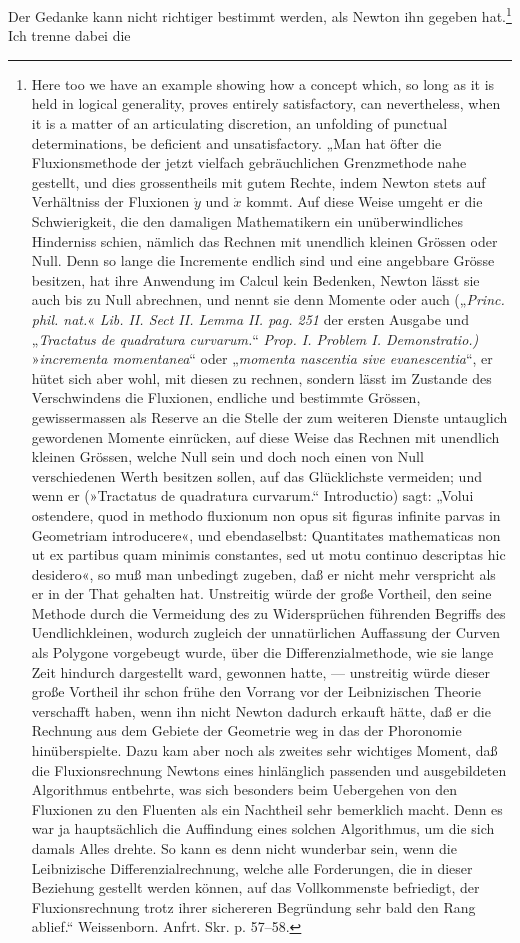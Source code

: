 \documentclass[12pt,a4paper,openany]{book}
\begin{document}
Der Gedanke kann nicht richtiger bestimmt werden,
als Newton ihn gegeben hat.\footnote[2]{Here too we have an example showing how a concept which, so long as it is held in logical generality, proves entirely satisfactory, can nevertheless, when it is a matter of an articulating discretion, an unfolding of punctual determinations, be deficient and unsatisfactory. „Man hat öfter die Fluxionsmethode der jetzt vielfach gebräuchlichen Grenzmethode nahe gestellt, und dies grossentheils mit gutem Rechte, indem Newton stets auf Verhältniss der Fluxionen $\dot{y}$ und $\dot{x}$ kommt. Auf diese Weise umgeht er die Schwierigkeit, die den damaligen Mathematikern ein unüberwindliches Hinderniss schien, nämlich das Rechnen mit unendlich kleinen Grössen oder Null. Denn so lange die Incremente endlich sind und eine angebbare Grösse besitzen, hat ihre Anwendung im Calcul kein Bedenken, Newton lässt sie auch bis zu Null abrechnen, und nennt sie denn Momente oder auch („\textit{Princ. phil. nat.}« \textit{Lib. II. Sect II. Lemma II. pag. 251} der ersten Ausgabe und „\textit{Tractatus de quadratura curvarum.}“ \textit{Prop. I. Problem I. Demonstratio.)} »\textit{incrementa momentanea}“ oder „\textit{momenta nascentia sive evanescentia}“, er hütet sich aber wohl, mit diesen zu rechnen, sondern lässt im Zustande des Verschwindens die Fluxionen, endliche und bestimmte Grössen, gewissermassen als Reserve an die Stelle der zum weiteren Dienste untauglich gewordenen Momente einrücken, auf diese Weise das Rechnen mit unendlich kleinen Grössen, welche Null sein und doch noch einen von Null verschiedenen Werth besitzen sollen, auf das Glücklichste vermeiden; und wenn er (»Tractatus de quadratura curvarum.“ Introductio) sagt: „Volui ostendere, quod in methodo fluxionum non opus sit figuras infinite parvas in Geometriam introducere«, und ebendaselbst: Quantitates mathematicas non ut ex partibus quam minimis constantes, sed ut motu continuo descriptas hic desidero«, so muß man unbedingt zugeben, daß er nicht mehr verspricht als er in der That gehalten hat. Unstreitig würde der große Vortheil, den seine Methode durch die Vermeidung des zu Widersprüchen führenden Begriffs des Uendlichkleinen, wodurch zugleich der unnatürlichen Auffassung der Curven als Polygone vorgebeugt wurde, über die Differenzialmethode, wie sie lange Zeit hindurch dargestellt ward, gewonnen hatte, — unstreitig würde dieser große Vortheil ihr schon frühe den Vorrang vor der Leibnizischen Theorie verschafft haben, wenn ihn nicht Newton dadurch erkauft hätte, daß er die Rechnung aus dem Gebiete der Geometrie weg in das der Phoronomie hinüberspielte. Dazu kam aber noch als zweites sehr wichtiges Moment, daß die Fluxionsrechnung Newtons eines hinlänglich passenden und ausgebildeten Algorithmus entbehrte, was sich besonders beim Uebergehen von den Fluxionen zu den Fluenten als ein Nachtheil sehr bemerklich macht. Denn es war ja hauptsächlich die Auffindung eines solchen Algorithmus, um die sich damals Alles drehte. So kann es denn nicht wunderbar sein, wenn die Leibnizische Differenzialrechnung, welche alle Forderungen, die in dieser Beziehung gestellt werden können, auf das Vollkommenste befriedigt, der Fluxionsrechnung trotz ihrer sichereren Begründung sehr bald den Rang ablief.“ Weissenborn. Anfrt. Skr. p. 57--58.} Ich trenne dabei die %
\end{document}
